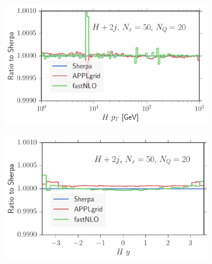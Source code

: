 \begin{figure}
\centering
\begin{subfigure}[]{0.49\textwidth}
	\includegraphics[width=\textwidth]{images/hjjb_hpt.pdf}
\end{subfigure}
\begin{subfigure}[]{0.49\textwidth}
	\includegraphics[width=\textwidth]{images/hjjb_hy.pdf}
\end{subfigure}


\end{figure}

